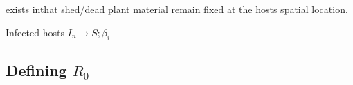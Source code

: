 

exists inthat shed/dead plant material remain fixed at the hosts spatial location. 

Infected hosts $I_n\rightarrow S; \beta_i$



\blindtext

\subsection{Defining $R_0$}


